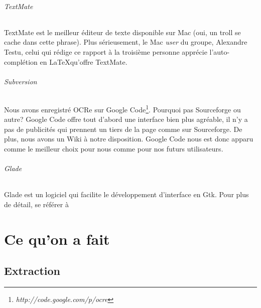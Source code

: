 \documentclass[]{report}
\begin{document}
			\paragraph{TextMate\\} %
			\label{par:textmate}
				TextMate est le meilleur \'editeur de texte disponible sur Mac (oui, un troll se cache dans cette phrase). Plus s\'erieusement, le Mac \emph{user} du groupe, Alexandre Testu, celui qui r\'edige ce rapport \`a la troisi\`eme personne appr\'ecie l'auto-compl\'etion en \LaTeX qu'offre TextMate.
			\paragraph{Subversion\\} %
			\label{par:subversion}
				Nous avons enregistr\'e OCRe sur Google Code\footnote{\emph{http://code.google.com/p/ocre}}. Pourquoi pas Sourceforge ou autre? Google Code offre tout d'abord une interface bien plus agr\'eable, il n'y a pas de publicit\'es qui prennent un tiers de la page comme sur Sourceforge. De plus, nous avons un Wiki \`a notre disposition. Google Code nous est donc apparu comme le meilleur choix pour nous comme pour nos futurs utilisateurs.
			\paragraph{Glade} %
				Glade est un logiciel qui facilite le d\'eveloppement d'interface en Gtk. Pour plus de d\'etail, se r\'ef\'erer \`a %
			\label{par:glade}





\part{Ce qu'on a fait} %
\label{prt:ce_qu_on_a_fait}


	\chapter{Extraction} %
	\label{cha:extraction}
	
	
\end{document}

